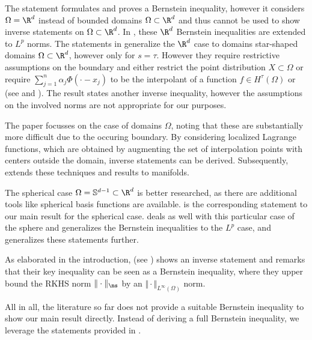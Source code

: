 \documentclass[a4paper, 10pt]{article}
\begin{document}
The statement \cite[Theorem 5.1]{narcowich2006sobolev} formulates and proves a Bernstein inequality,
however it considers $\Omega = \R^d$ instead of bounded domains $\Omega \subset \R^d$ and thus cannot be used to show inverse statements on $\Omega \subset \R^d$.
In \cite{ward2012lp}, these $\R^d$ Bernstein inequalities are extended to $L^p$ norms.
%
The statements in \cite[Section 6]{rieger2008sampling} generalize the $\R^d$ case to domains star-shaped domains $\Omega \subset \R^d$, 
however only for $s = \tau$.
However they require restrictive assumptions on the boundary and either restrict the point distribution $X \subset \Omega$  or require $\sum_{j=1}^n \alpha_j \Phi(\cdot - x_j)$ to be the interpolant of a function $f \in H^\tau(\Omega)$ or 
(see \cite[Theorem 6.4.1]{rieger2008sampling} and \cite[Corollary 6.5.3]{rieger2008sampling}).
The result \cite[Lemma 3.2]{cheung2018convergence} states another inverse inequality,
however the assumptions on the involved norms are not appropriate for our purposes.

The paper \cite{hangelbroek2018inverse} focusses on the case of domains $\Omega$, noting that these are substantially more difficult due to the occuring boundary.
By considering localized Lagrange functions, which are obtained by augmenting the set of interpolation points with centers outside the domain, inverse statements can be derived.
Subsequently, \cite{hangelbroek2018direct} extends these techniques and results to manifolds.

%
The spherical case $\Omega = \mathbb{S}^{d-1} \subset \R^d$ is better researched, 
as there are additional tools like spherical basis functions are available.
\cite[Theorem 6.2]{narcowich2007direct} is the corresponding statement to our main result  for the spherical case.
\cite{mhaskar2010bernstein} deals as well with this particular case of the sphere and generalizes the Bernstein inequalities to the $L^p$ case,
and \cite[Lemma 9.2]{mirzaei2018petrov} generalizes these statements further.

As elaborated in the introduction, 
\cite[Theorem 6.1]{schaback2002inverse} (see ) shows an inverse statement and remarks that their key inequality can be seen as a Bernstein inequality, 
where they upper bound the RKHS norm $\Vert \cdot \Vert_{\ns}$ by an $\Vert \cdot \Vert_{L^\infty(\Omega)}$ norm. \newline

All in all, the literature so far does not provide a suitable Bernstein inequality to show our main result  directly.
Instead of deriving a full Bernstein inequality, we leverage the statements provided in .
\end{document}
